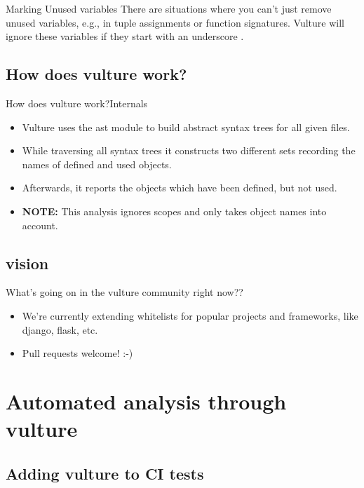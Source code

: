 \documentclass{beamer}
\begin{document}
\begin{frame}{Marking Unused variables}
    There are situations where you can't just remove unused variables, e.g., in tuple assignments or function signatures. Vulture will ignore these variables if they start with an underscore .   
\end{frame}
\subsection{How does vulture work?}

\begin{frame}{How does vulture work?}{Internals}
\begin{itemize}
    \item Vulture uses the ast module to build abstract syntax trees for all given files.
    \pause
    \item While traversing all syntax trees it constructs two different sets recording the names of defined and used objects.
    \pause
    \item Afterwards, it reports the objects which have been defined, but not used.
    \pause
    \item
    \textbf{NOTE:} This analysis ignores scopes and only takes object names into account.
\end{itemize}
\end{frame}

\subsection*{vision}
\begin{frame}{What's going on in the vulture community right now??}
    \begin{itemize}
        \item We're currently extending whitelists for popular projects and frameworks, like django, flask, etc.
        \item Pull requests welcome! :-)
    \end{itemize}
\end{frame}

\section{Automated analysis through vulture}

\subsection{Adding vulture to CI tests}
\end{document}
